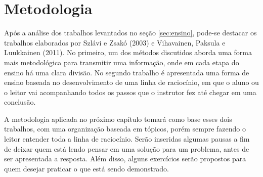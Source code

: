 
\chapter{Metodologia}
\label{chap:metodo}
Após a análise dos trabalhos levantados no seção \ref{sec:ensino}, pode-se destacar os trabalhos elaborados por Szlávi e Zsakó (2003) e Vihavainen, Paksula e Luukkainen (2011). No primeiro, um dos métodos discutidos aborda uma forma mais metodológica para transmitir uma informação, onde em cada etapa do ensino há uma clara divisão. No segundo trabalho é apresentada uma forma de ensino baseada no desenvolvimento de uma linha de raciocínio, em que o aluno ou o leitor vai acompanhando todos os passos que o instrutor fez até chegar em uma conclusão.

A metodologia aplicada no próximo capítulo tomará como base esses dois trabalhos, com uma organização baseada em tópicos, porém sempre fazendo o leitor entender toda a linha de raciocínio. Serão inseridas algumas pausas a fim de deixar quem está lendo pensar em uma solução para um problema, antes de ser apresentada a resposta. Além disso, alguns exercícios serão propostos para quem desejar praticar o que está sendo demonstrado.

